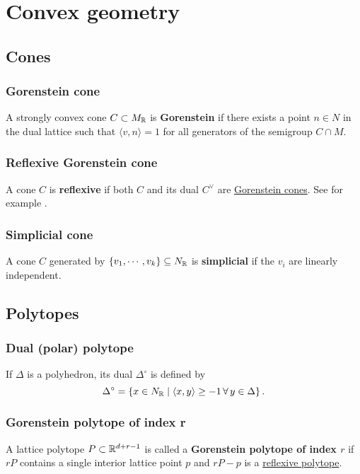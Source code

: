 \documentclass[11pt, english]{article}
\begin{document}
\section{Convex geometry}
\subsection{Cones}
\subsubsection{Gorenstein cone}
\label{gorensteincone}

A strongly convex cone $C \subset M_{\mathbb{R}}$ is \textbf{Gorenstein} if there exists a point $n \in N$ in the dual lattice such that $\langle v,n \rangle = 1$ for all generators of the semigroup $C \cap M$.

\subsubsection{Reflexive Gorenstein cone}
\label{reflexivegorensteincone}

A cone $C$ is \textbf{reflexive} if both $C$ and its dual $C^\vee$ are \hyperref[gorensteincone]{Gorenstein cones}. See for example \cite{mirrorsymalggeo}.

\subsubsection{Simplicial cone}
A cone $C$ generated by $\{v_1, \cdots, v_k \} \subseteq N_{\mathbb{R}}$ is \textbf{simplicial} if the $v_i$ are linearly independent.

\subsection{Polytopes}

\subsubsection{Dual (polar) polytope}
\label{polarpolyhedron}

If $\Delta$ is a polyhedron, its dual $\Delta^\circ$ is defined by
\[
\Delta^\circ = \left\{ x \in N_{\mathbb{R}} \mid \langle x,y\rangle \geq -1 \,\forall \, y \in \Delta \right\}.
\]

\subsubsection{Gorenstein polytope of index r}
\label{gorensteinpolytope}
A lattice polytope $P \subset \mathbb{R}^{d+r-1}$ is called a \textbf{Gorenstein polytope of index $r$} if $rP$ contains a single interior lattice point $p$ and $rP-p$ is a \hyperref[reflexivepolytope]{reflexive polytope}.
\end{document}
